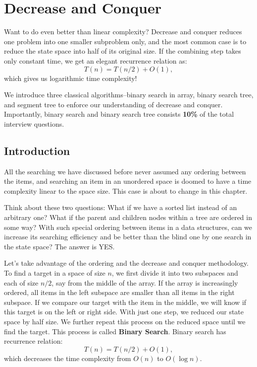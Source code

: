 \documentclass[main.tex]{subfiles}
\begin{document}
\chapter{Decrease and Conquer}
Want to do even better than  linear complexity? Decrease and conquer reduces one problem into one smaller subproblem only, and the most common case is to reduce the state space into half of its original size. If the combining step takes only constant time, we get an elegant recurrence relation as:
\begin{equation}
    T(n) = T(n/2) + O(1),
\end{equation}
which gives us logarithmic time complexity!

We introduce three classical algorithms--binary search in array, binary search tree, and segment tree to enforce our understanding of decrease and conquer. Importantly, binary search and binary search tree consists \textbf{10\%} of the total interview questions. 
\section{Introduction}
All the searching we have discussed before never assumed any ordering between the items, and searching an item in an unordered space is doomed to have a time complexity linear to the space size. This case is about to change in this chapter. 

Think about these two questions: What if we have a sorted list instead of an arbitrary one? What if the parent and children nodes within a tree are ordered in some way? With such special ordering between items in a data structures, can we increase its searching efficiency and be better than the blind one by one search in the state space? The answer is YES.

Let's take advantage of the ordering and the decrease and conquer methodology. To find a target in a space of size $n$, we first divide it into two subspaces and each of size $n/2$, say from the middle of the array. If the array is increasingly ordered, all items in the left subspace are smaller than all items in the right subspace. If we compare our target with the item in the middle, we will know if this target is on the left or right side. With just one step, we reduced our state space by half size. We further repeat this process on the reduced space until we find the target. This process is called \textbf{Binary Search}. Binary search has recurrence relation:
\begin{equation}
   T(n) = T(n/2) + O(1) ,
\end{equation}
which decreases the time complexity from $O(n)$ to $O(\log n)$.
\end{document}
